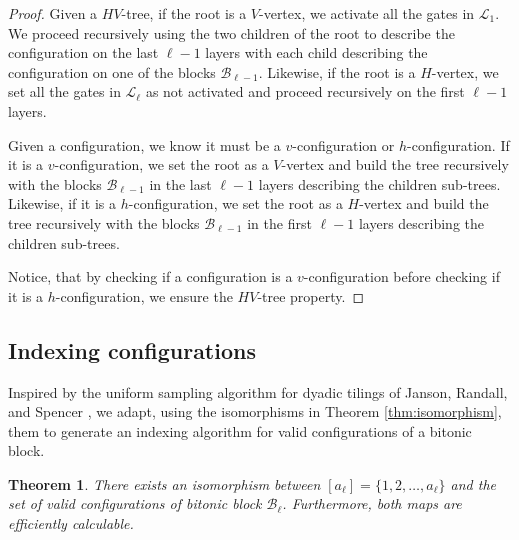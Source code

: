 \documentclass[11pt,letterpaper]{article}
\newtheorem{theorem}{Theorem}[section]
\theoremstyle{definition}
\theoremstyle{remark}
\newcommand{\cB}{\mathcal B}
\newcommand{\cL}{\mathcal L}
\numberwithin{equation}{section}
\theoremstyle{definition}
\begin{document}
\begin{proof}
Given a $HV$-tree, if the root is a $V$-vertex, we activate all the gates in $\cL_1$. We proceed recursively using the two children of the root to describe the configuration on the last $\ell - 1$ layers with each child describing the configuration on one of the blocks $\cB_{\ell - 1}$. Likewise, if the root is a $H$-vertex, we set all the gates in $\cL_{\ell}$ as not activated and proceed recursively on the first $\ell - 1$ layers.

Given a configuration, we know it must be a $v$-configuration or $h$-configuration. If it is a $v$-configuration, we set the root as a $V$-vertex and build the tree recursively with the blocks $\cB_{\ell - 1}$ in the last $\ell - 1$ layers describing the children sub-trees. Likewise, if it is a $h$-configuration, we set the root as a $H$-vertex and build the tree recursively with the blocks $\cB_{\ell - 1}$ in the first $\ell - 1$ layers describing the children sub-trees.

Notice, that by checking if a configuration is a $v$-configuration before checking if it is a $h$-configuration, we ensure the $HV$-tree property.
\end{proof}

%
%
%
%
%
%
%
%
%
%
%
%
%

%

%

%

%

%

\subsection{Indexing configurations}

Inspired by the uniform sampling algorithm for dyadic tilings of Janson, Randall, and Spencer \cite{randomdyadictilingsoftheunitsquare}, we adapt, using the isomorphisms in Theorem \ref{thm:isomorphism}, them to generate an indexing algorithm for valid configurations of a bitonic block.

\begin{theorem}
There exists an isomorphism between $[a_\ell] = \{1, 2, \ldots, a_\ell\}$ and the set of valid configurations of bitonic block $\cB_\ell$. Furthermore, both maps are efficiently calculable.
\end{theorem}
\end{document}
